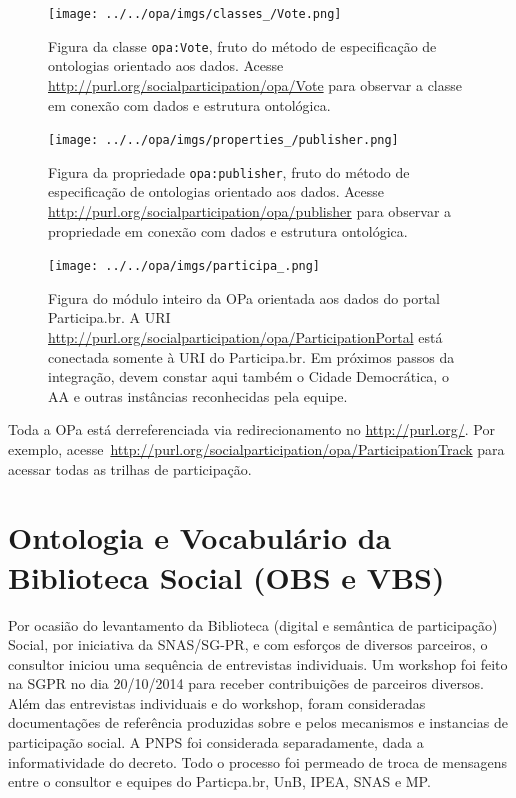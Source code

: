 \documentclass[12pt]{article}
\begin{document}
\begin{figure}[h!]
  \centering
    \texttt{[image: ../../opa/imgs/classes\_/Vote.png]}
  \caption{Figura da classe \texttt{opa:Vote}, fruto do método de especificação de ontologias orientado aos dados. Acesse \url{http://purl.org/socialparticipation/opa/Vote} para observar a classe em conexão com dados e estrutura ontológica.}\label{fig:opa1}
\end{figure}

\begin{figure}[h!]
  \centering
    \texttt{[image: ../../opa/imgs/properties\_/publisher.png]}
  \caption{Figura da propriedade \texttt{opa:publisher}, fruto do método de especificação de ontologias orientado aos dados. Acesse \url{http://purl.org/socialparticipation/opa/publisher} para observar a propriedade em conexão com dados e estrutura ontológica.}\label{fig:opa2}
\end{figure}

\begin{figure}[h!]
  \centering
    \texttt{[image: ../../opa/imgs/participa\_.png]}
  \caption{Figura do módulo inteiro da OPa orientada aos dados do portal Participa.br. A URI \url{http://purl.org/socialparticipation/opa/ParticipationPortal} está conectada somente à URI do Participa.br. Em próximos passos da integração, devem constar aqui também o Cidade Democrática, o AA e outras instâncias reconhecidas pela equipe.}\label{fig:opa3}
\end{figure}



Toda a OPa está derreferenciada via redirecionamento no \url{http://purl.org/}. Por exemplo, acesse~\url{http://purl.org/socialparticipation/opa/ParticipationTrack} para acessar todas as trilhas de participação.

\newpage
\section{Ontologia e Vocabulário da Biblioteca Social (OBS e VBS)}
Por ocasião do levantamento da Biblioteca (digital e semântica de participação) Social, por iniciativa da SNAS/SG-PR, e com esforços de diversos parceiros, o consultor iniciou uma sequência de entrevistas individuais. Um workshop foi feito na SGPR no dia 20/10/2014 para receber contribuições de parceiros diversos. Além das entrevistas individuais e do workshop, foram consideradas documentações de referência produzidas sobre e pelos mecanismos e instancias de participação social. A PNPS foi considerada separadamente, dada a informatividade do decreto. Todo o processo foi permeado de troca de mensagens entre o consultor e equipes do Particpa.br, UnB, IPEA, SNAS e MP.
\end{document}
